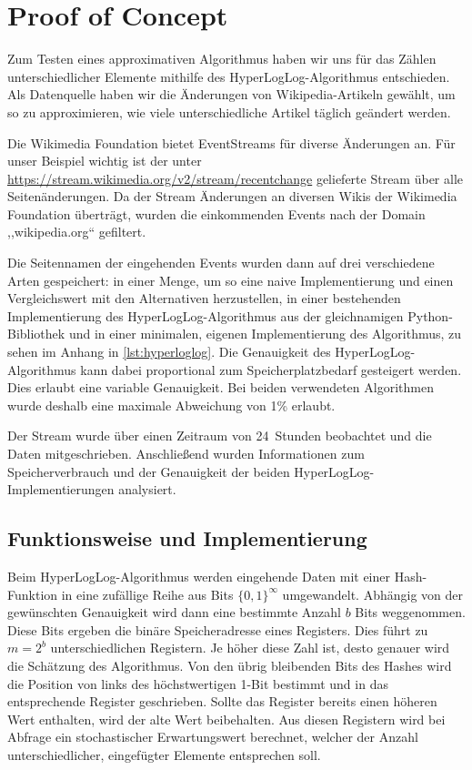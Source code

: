 \section{Proof of Concept}
\label{sec:proof-of-concept}

Zum Testen eines approximativen Algorithmus haben wir uns für das Zählen unterschiedlicher Elemente mithilfe des HyperLogLog-Algorithmus entschieden.
Als Datenquelle haben wir die Änderungen von Wikipedia-Artikeln gewählt, um so zu approximieren, wie viele unterschiedliche Artikel täglich geändert werden.

Die Wikimedia Foundation bietet EventStreams für diverse Änderungen an.
Für unser Beispiel wichtig ist der unter \url{https://stream.wikimedia.org/v2/stream/recentchange} gelieferte Stream über alle Seitenänderungen.
Da der Stream Änderungen an diversen Wikis der Wikimedia Foundation überträgt, wurden die einkommenden Events nach der Domain ,,wikipedia.org`` gefiltert.

Die Seitennamen der eingehenden Events wurden dann auf drei verschiedene Arten gespeichert:  in einer Menge, um so eine naive Implementierung und einen Vergleichswert mit den Alternativen herzustellen, in einer bestehenden Implementierung des HyperLogLog-Algorithmus aus der gleichnamigen Python-Bibliothek \cite{evseenko2018} und in einer minimalen, eigenen Implementierung des Algorithmus, zu sehen im Anhang in \autoref{lst:hyperloglog}.
Die Genauigkeit des HyperLogLog-Algorithmus kann dabei proportional zum Speicherplatzbedarf gesteigert werden.
Dies erlaubt eine variable Genauigkeit.
Bei beiden verwendeten Algorithmen wurde deshalb eine maximale Abweichung von 1\% erlaubt.

Der Stream wurde über einen Zeitraum von 24~Stunden beobachtet und die Daten mitgeschrieben.
Anschließend wurden Informationen zum Speicherverbrauch und der Genauigkeit der beiden HyperLogLog-Implementierungen analysiert.

\subsection{Funktionsweise und Implementierung}

Beim HyperLogLog-Algorithmus werden eingehende Daten mit einer Hash-Funktion in eine zufällige Reihe aus Bits $\{0, 1\}^\infty$ umgewandelt.
Abhängig von der gewünschten Genauigkeit wird dann eine bestimmte Anzahl $b$ Bits weggenommen.
Diese Bits ergeben die binäre Speicheradresse eines Registers.
Dies führt zu $m=2^b$ unterschiedlichen Registern.
Je höher diese Zahl ist, desto genauer wird die Schätzung des Algorithmus.
Von den übrig bleibenden Bits des Hashes wird die Position von links des höchstwertigen 1-Bit bestimmt und in das entsprechende Register geschrieben.
Sollte das Register bereits einen höheren Wert enthalten, wird der alte Wert beibehalten.
Aus diesen Registern wird bei Abfrage ein stochastischer Erwartungswert berechnet, welcher der Anzahl unterschiedlicher, eingefügter Elemente entsprechen soll.
\cite{flajolet2007}

